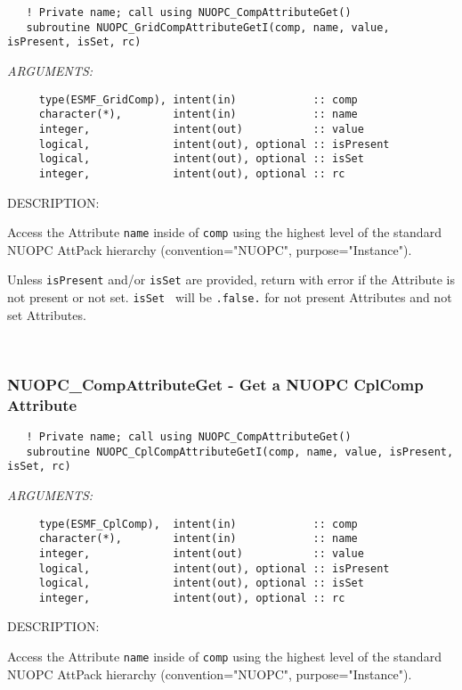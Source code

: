 \begin{verbatim}   ! Private name; call using NUOPC_CompAttributeGet() 
   subroutine NUOPC_GridCompAttributeGetI(comp, name, value, isPresent, isSet, rc)\end{verbatim}{\em ARGUMENTS:}
\begin{verbatim}     type(ESMF_GridComp), intent(in)            :: comp
     character(*),        intent(in)            :: name
     integer,             intent(out)           :: value
     logical,             intent(out), optional :: isPresent
     logical,             intent(out), optional :: isSet
     integer,             intent(out), optional :: rc\end{verbatim}
{\sf DESCRIPTION:\\ }


     Access the Attribute {\tt name} inside of {\tt comp} using the highest level
     of the standard NUOPC AttPack hierarchy (convention="NUOPC", 
     purpose="Instance").
  
     Unless {\tt isPresent} and/or {\tt isSet} are provided, return with error
     if the Attribute is not present or not set. {\tt isSet } will be 
     {\tt .false.} for not present Attributes and not set Attributes. 
 
\mbox{}\hrulefill\ 
 
\subsubsection [NUOPC\_CompAttributeGet] {NUOPC\_CompAttributeGet - Get a NUOPC CplComp Attribute}


\begin{verbatim}   ! Private name; call using NUOPC_CompAttributeGet() 
   subroutine NUOPC_CplCompAttributeGetI(comp, name, value, isPresent, isSet, rc)\end{verbatim}{\em ARGUMENTS:}
\begin{verbatim}     type(ESMF_CplComp),  intent(in)            :: comp
     character(*),        intent(in)            :: name
     integer,             intent(out)           :: value
     logical,             intent(out), optional :: isPresent
     logical,             intent(out), optional :: isSet
     integer,             intent(out), optional :: rc\end{verbatim}
{\sf DESCRIPTION:\\ }


     Access the Attribute {\tt name} inside of {\tt comp} using the highest level
     of the standard NUOPC AttPack hierarchy (convention="NUOPC", 
     purpose="Instance").
  
